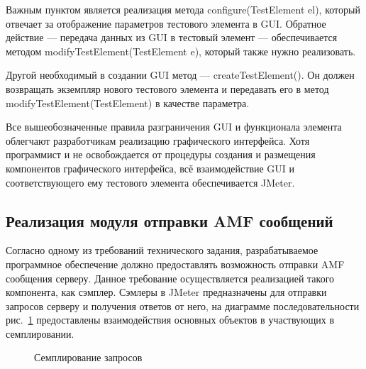 Важным пунктом является реализация метода configure(TestElement el), который отвечает за отображение
параметров тестового элемента в GUI. Обратное действие --- передача данных из GUI в тестовый
элемент --- обеспечивается методом modifyTestElement(TestElement e), который также нужно реализовать.

Другой необходимый в создании GUI метод --- createTestElement(). Он должен возвращать экземпляр нового
тестового элемента и передавать его в метод modifyTestElement(TestElement) в качестве параметра.

Все вышеобозначенные правила разграничения GUI и функционала элемента облегчают разработчикам реализацию графического
интерфейса. Хотя программист и не освобождается от процедуры создания и размещения компонентов графического
интерфейса, всё взаимодействие GUI и соответствующего ему тестового элемента обеспечивается JMeter.

\subsection{Реализация модуля отправки AMF сообщений}

Согласно одному из требований технического задания, разрабатываемое программное обеспечение должно предоставлять
возможность отправки AMF сообщения серверу. Данное требование осуществляется реализацией такого компонента, как
сэмплер. Сэмлеры в JMeter предназначены для отправки запросов серверу и получения ответов от него, на диаграмме
последовательности рис.~\ref{ris:Diagram4.png} предоставлены взаимодействия основных объектов в участвующих в
семплировании.

\begin{figure}
\caption{Семплирование запросов}
\label{ris:Diagram4.png}
\end{figure}

